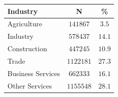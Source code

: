 \begin{tabular}{l*{2}{c}}
\hline\hline
Industry & N & \% \\
\hline
Agriculture & $141867$ & $3.5$ \\
Industry & $578437$ & $14.1$ \\
Construction & $447245$ & $10.9$ \\
Trade & $1122181$ & $27.3$ \\
Business Services & $662333$ & $16.1$ \\
Other Services & $1155548$ & $28.1$ \\
\hline\hline
\end{tabular}
